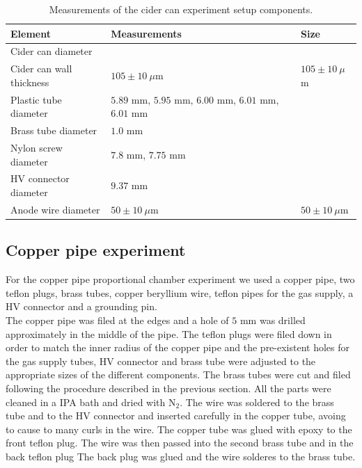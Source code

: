\begin{table}[htb]
	\begin{tabularx}{\linewidth}{X|X|p{2cm}}
			\textbf{Element}         & \textbf{Measurements}                                 & \textbf{Size}       \\ \hline
			Cider can diameter       &                                                       &                     \\
			Cider can wall thickness & $105 \pm 10 \ \mu$m                                   & $105 \pm 10 \ \mu$m \\
			Plastic tube diameter    & $5.89$ mm, $5.95$ mm, $6.00$ mm, $6.01$ mm, $6.01$ mm &                     \\
			Brass tube diameter      & $1.0$ mm                                              &                     \\
			Nylon screw diameter     & $7.8$ mm, $7.75$ mm                                   &                     \\
			HV connector diameter    & $9.37$ mm                                             &                     \\
			Anode wire diameter      & $50 \pm 10 \ \mu$m                                    & $50 \pm 10 \ \mu$m 
	\end{tabularx}
\caption{Measurements of the cider can experiment setup components.}
\label{Tab:cidercan_sizes}
\end{table}



\subsection{Copper pipe experiment}
For the copper pipe proportional chamber experiment we used a copper pipe, two teflon plugs, brass tubes, copper beryllium wire, teflon pipes for the gas supply, a HV connector and a grounding pin. \\
The copper pipe was filed at the edges and a hole of $5$ mm was drilled approximately in the middle of the pipe. The teflon plugs were filed down in order to match the inner radius of the copper pipe and the pre-existent holes for the gas supply tubes, HV connector and brass tube were adjusted to the appropriate sizes of the different components. The brass tubes were cut and filed following the procedure described in the previous section. All the parts were cleaned in a IPA bath and dried with N$_2$. The wire was soldered to the brass tube and to the HV connector and inserted carefully in the copper tube, avoing to cause to many curls in the wire. The copper tube was glued with epoxy to the front teflon plug. The wire was then passed into the second brass tube and in the back teflon plug  The back plug was glued and the wire solderes to the brass tube.



